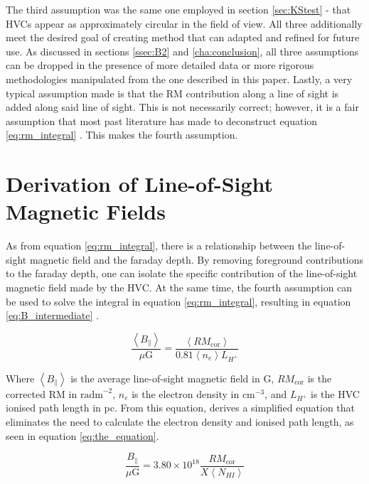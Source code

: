 The third assumption was the same one employed in section \ref{sec:KStest} - that HVCs appear as approximately circular in the field of view. All three additionally meet the desired goal of creating method that can adapted and refined for future use. As discussed in sections \ref{ssec:B2} and \ref{cha:conclusion}, all three assumptions can be dropped in the presence of more detailed data or more rigorous methodologies manipulated from the one described in this paper. Lastly, a very typical assumption made is that the RM contribution along a line of sight is added along said line of sight. This is not necessarily correct; however, it is a fair assumption that most past literature has made to deconstruct equation \ref{eq:rm_integral} \citep{ID27, ID3, ID26}. This makes the fourth assumption.


\section{Derivation of Line-of-Sight Magnetic Fields}
\label{sec:los_dev}

As from equation \ref{eq:rm_integral}, there is a relationship between the line-of-sight magnetic field and the faraday depth. By removing foreground contributions to the faraday depth, one can isolate the specific contribution of the line-of-sight magnetic field made by the HVC. At the same time, the fourth assumption can be used to solve the integral in equation \ref{eq:rm_integral}, resulting in equation \ref{eq:B_intermediate} \citep{ID26}.


\begin{equation}
    \frac{\left<B_{\parallel}\right>}{\mu\mathrm{G}}=\frac{\left<RM_{\mathrm{cor}}\right>}{0.81\left<n_e\right>L_{H^+}}
\label{eq:B_intermediate}
\end{equation}


Where $\left<B_{\parallel}\right>$ is the average line-of-sight magnetic field in \textmu G, $RM_{\mathrm{cor}}$ is the corrected RM in $\mathrm{rad m}^{-2}$, $n_e$ is the electron density in $\mathrm{cm}^{-3}$, and $L_{H^+}$ is the HVC ionised path length in pc. From this equation, \cite{ID27} derives a simplified equation that eliminates the need to calculate the electron density and ionised path length, as seen in equation \ref{eq:the_equation}.


\begin{equation}
    \frac{B_{\parallel}}{\mu\mathrm{G}}=3.80\times10^{18}\frac{RM_{\mathrm{cor}}}{X\left<N_{HI}\right>}
\label{eq:the_equation}
\end{equation}


